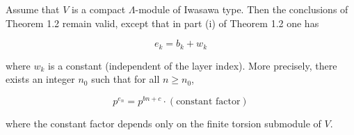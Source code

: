 Assume that $V$ is a compact $\Lambda$-module of Iwasawa type. Then the conclusions of Theorem 1.2 remain valid, except that in part (i) of Theorem 1.2 one has

$$e_k = b_k + w_k$$

where $w_k$ is a constant (independent of the layer index). More precisely, there exists an integer $n_0$ such that for all $n \geq n_0$,

$$p^{e_n} = p^{b n + c} \cdot (\text{constant factor})$$

where the constant factor depends only on the finite torsion submodule of $V$.
